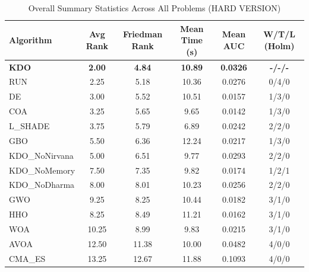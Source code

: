 \begin{table}[htbp]
\centering
\caption{Overall Summary Statistics Across All Problems (HARD VERSION)}
\label{tab:summary}
\small
\begin{tabular}{lccccc}
\toprule
\textbf{Algorithm} & \textbf{Avg Rank} & \textbf{Friedman Rank} & \textbf{Mean Time (s)} & \textbf{Mean AUC} & \textbf{W/T/L (Holm)} \\
\midrule
\textbf{KDO} & \textbf{2.00} & \textbf{4.84} & \textbf{10.89} & \textbf{0.0326} & \textbf{-/-/-} \\
RUN & 2.25 & 5.18 & 10.36 & 0.0276 & 0/4/0 \\
DE & 3.00 & 5.52 & 10.51 & 0.0157 & 1/3/0 \\
COA & 3.25 & 5.65 & 9.65 & 0.0142 & 1/3/0 \\
L_SHADE & 3.75 & 5.79 & 6.89 & 0.0242 & 2/2/0 \\
GBO & 5.50 & 6.36 & 12.24 & 0.0217 & 1/3/0 \\
KDO_NoNirvana & 5.00 & 6.51 & 9.77 & 0.0293 & 2/2/0 \\
KDO_NoMemory & 7.50 & 7.35 & 9.82 & 0.0174 & 1/2/1 \\
KDO_NoDharma & 8.00 & 8.01 & 10.23 & 0.0256 & 2/2/0 \\
GWO & 9.25 & 8.25 & 10.44 & 0.0182 & 3/1/0 \\
HHO & 8.25 & 8.49 & 11.21 & 0.0162 & 3/1/0 \\
WOA & 10.25 & 8.99 & 9.83 & 0.0215 & 3/1/0 \\
AVOA & 12.50 & 11.38 & 10.00 & 0.0482 & 4/0/0 \\
CMA_ES & 13.25 & 12.67 & 11.88 & 0.1093 & 4/0/0 \\
\bottomrule
\end{tabular}
\end{table}
